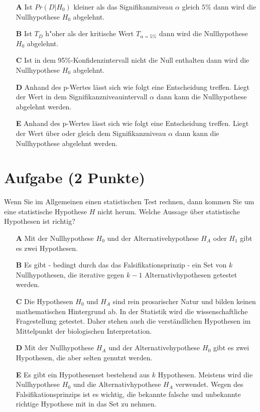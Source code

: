 \documentclass[a4paper, 9pt]{scrartcl}\usepackage[]{graphicx}\usepackage[]{xcolor}
\begin{document}
\begin{enumerate}
\item [\textbf{A} \msquare] Ist $Pr(D|H_0)$ kleiner als das Signifikanzniveau $\alpha$ gleich $5\%$ dann wird die Nullhypothese $H_0$ abgelehnt.
\item [\textbf{B} \msquare] Ist $T_{D}$ h{"o}her als der kritische Wert $T_{\alpha = 5\%}$ dann wird die Nullhypothese $H_0$ abgelehnt.
\item [\textbf{C} \msquare] Ist in dem 95\%-Konfidenzintervall nicht die Null enthalten dann wird die Nullhypothese $H_0$ abgelehnt.
\item [\textbf{D} \msquare] Anhand des p-Wertes lässt sich wie folgt eine Entscheidung treffen. Liegt der Wert in dem Signifikanzniveauintervall $\alpha$ dann kann die Nullhypothese abgelehnt werden.
\item [\textbf{E} \msquare] Anhand des p-Wertes lässt sich wie folgt eine Entscheidung treffen. Liegt der Wert über oder gleich dem Signifikanzniveau $\alpha$ dann kann die Nullhypothese abgelehnt werden.
\end{enumerate}

\section{Aufgabe \hfill (2 Punkte)}



Wenn Sie im Allgemeinen einen statistischen Test rechnen, dann kommen Sie um eine statistische Hypothese $H$ nicht herum. Welche Aussage über statistische Hypothesen ist richtig?



\begin{enumerate}
\item [\textbf{A} \msquare] Mit der Nullhypothese $H_0$ und der Alternativehypothese $H_A$ oder $H_1$ gibt es zwei Hypothesen.
\item [\textbf{B} \msquare] Es gibt - bedingt durch das das Falsifikationsprinzip - ein Set von $k$ Nullhypothesen, die iterative gegen $k-1$ Alternativhypothesen getestet werden.
\item [\textbf{C} \msquare] Die Hypothesen $H_0$ und $H_A$ sind rein prosarischer Natur und bilden keinen mathematischen Hintergrund ab. In der Statistik wird die wissenschaftliche Fragestellung getestet. Daher stehen auch die verständlichen Hypothesen im Mittelpunkt der biologischen Interpretation.
\item [\textbf{D} \msquare] Mit der Nullhypothese $H_A$ und der Alternativehypothese $H_0$ gibt es zwei Hypothesen, die aber selten genutzt werden.
\item [\textbf{E} \msquare] Es gibt ein Hypothesenset bestehend aus $k$ Hypothesen. Meistens wird die Nullhypothese $H_0$ und die Alternativhypothese $H_A$ verwendet. Wegen des Falsifikationsprinzips ist es wichtig, die bekannte falsche und unbekannte richtige Hypothese mit in das Set zu nehmen.
\end{enumerate}
\end{document}
